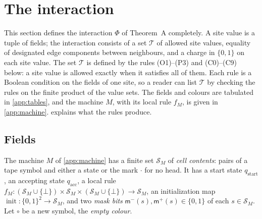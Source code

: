 \section{The interaction}\label{sec:interaction}

This section defines the interaction $\Phi$ of Theorem~A completely. A site value is a tuple of fields; the interaction consists of a set $\mathcal T$ of allowed site values, equality of designated edge components between neighbours, and a charge in $\{0,1\}$ on each site value. The set $\mathcal T$ is defined by the rules (O1)--(P3) and (C0)--(C9) below: a site value is allowed exactly when it satisfies all of them. Each rule is a Boolean condition on the fields of one site, so a reader can list $\mathcal T$ by checking the rules on the finite product of the value sets. The fields and colours are tabulated in \cref{app:tables}, and the machine $M$, with its local rule $f_M$, is given in \cref{app:machine}.  explains what the rules produce.

\subsection{Fields}\label{int:sub-fields}

The machine $M$ of \cref{app:machine} has a finite set $\mathcal S_M$ of \emph{cell contents}: pairs of a tape symbol and either a state or the mark $\cdot$ for no head. It has a start state $q_{\mathrm{start}}$, an accepting state $q_{\mathrm{acc}}$, a local rule $f_M\colon(\mathcal S_M\cup\{\bot\})\times\mathcal S_M\times(\mathcal S_M\cup\{\bot\})\to\mathcal S_M$, an initialization map $\operatorname{init}\colon\{0,1\}^2\to\mathcal S_M$, and two \emph{mask bits} $\mathsf m^-(s),\mathsf m^+(s)\in\{0,1\}$ of each $s\in\mathcal S_M$. Let $\circ$ be a new symbol, the \emph{empty colour}.

